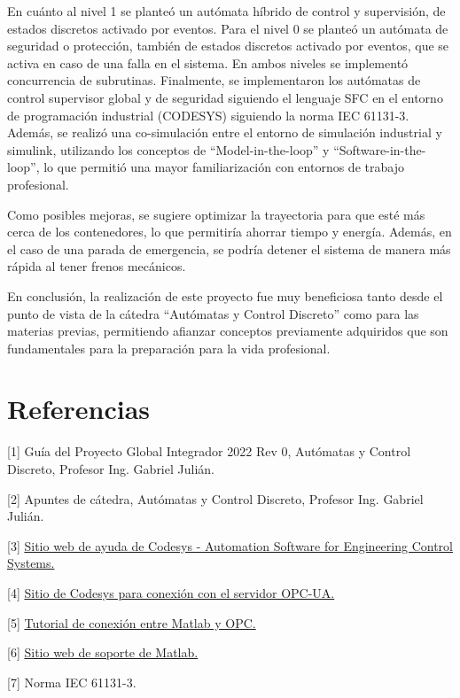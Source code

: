 \documentclass[11pt]{article}
\begin{document}
En cuánto al nivel 1 se planteó un autómata híbrido de control y supervisión, de estados discretos activado por eventos. Para el nivel 0 se planteó un autómata de seguridad o protección, también de estados discretos activado por eventos, que se activa en caso de una falla en el sistema. En ambos niveles se implementó concurrencia de subrutinas. Finalmente, se implementaron los autómatas de control supervisor global y de seguridad siguiendo el lenguaje SFC en el entorno de programación industrial (CODESYS) siguiendo la norma IEC 61131-3. Además, se realizó una co-simulación entre el entorno de simulación industrial y simulink, utilizando los conceptos de ``Model-in-the-loop'' y ``Software-in-the-loop'', lo que permitió una mayor familiarización con entornos de trabajo profesional.

Como posibles mejoras, se sugiere optimizar la trayectoria para que esté más cerca de los contenedores, lo que permitiría ahorrar tiempo y energía. Además, en el caso de una parada de emergencia, se podría detener el sistema de manera más rápida al tener frenos mecánicos.

En conclusión, la realización de este proyecto fue muy beneficiosa tanto desde el punto de vista de la cátedra ``Autómatas y Control Discreto'' como para las materias previas, permitiendo afianzar conceptos previamente adquiridos que son fundamentales para la preparación para la vida profesional.

\section{Referencias}

[1] Guía del Proyecto Global Integrador 2022 Rev 0, Autómatas y Control Discreto, Profesor Ing. Gabriel Julián.

[2] Apuntes de cátedra, Autómatas y Control Discreto, Profesor Ing. Gabriel Julián.

[3] \href{https://help.codesys.com}{Sitio web de ayuda de Codesys - Automation Software for Engineering Control Systems.}

[4] \href{https://www.codesys.com/products/codesys-runtime/opc-ua.html}{Sitio de Codesys para conexión con el servidor OPC-UA.}

[5] \href{https://www.halvorsen.blog/documents/technology/opc/}{Tutorial de conexión entre Matlab y OPC.}

[6] \href{https:/https://de.mathworks.com/help/matlab/help-and-support.
html}{Sitio web de soporte de Matlab.}

[7] Norma IEC 61131-3.
\end{document}

